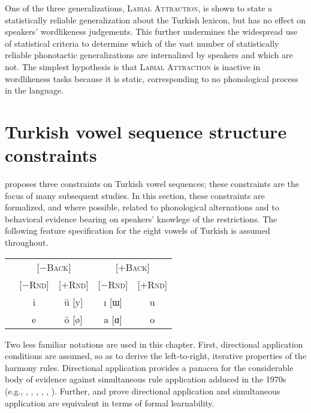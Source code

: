 One of the three generalizations, \textsc{Labial Attraction}, is shown to   state a statistically reliable generalization about the Turkish lexicon, but has no effect on speakers' wordlikeness judgements. This further undermines the widespread use of statistical criteria to determine which of the vast number of statistically reliable phonotactic generalizations are internalized by speakers and which are not. The simplest hypothesis is that \textsc{Labial Attraction} is inactive in wordlikeness tasks because it is static, corresponding to no phonological process in the language.

\section{Turkish vowel sequence structure constraints}

\citet{Lees1966b,Lees1966a} proposes three constraints on Turkish vowel sequences; these constraints are the focus of many subsequent studies. In this section, these constraints are formalized, and where possible, related to phonological alternations and to behavioral evidence bearing on speakers' knowlege of the restrictions. The following feature specification for the eight vowels of Turkish is assumed throughout.

\begin{example}
\begin{tabular}{c c c c c}
                       & \multicolumn{2}{c}{[$-$\textsc{Back}]} & \multicolumn{2}{c}{[$+$\textsc{Back}]} \\
                       & [$-$\textsc{Rnd}] & [$+$\textsc{Rnd}] & [$-$\textsc{Rnd}] & [$+$\textsc{Rnd}] \\ 
\cmidrule{2-5}
 & {i} & {ü} [y] & {ı} [ɯ] & {u} \\
 & {e} & {ö} [ø] & {a} [ɑ] & {o} \\
\end{tabular}
\end{example}

Two less familiar notations are used in this chapter. First, directional application conditions are assumed, so as to derive the left-to-right, iterative properties of the harmony rules. Directional application provides a panacea for the considerable body of evidence against simultaneous rule application adduced in the 1970s (e.g., \citealt[209f.]{Anderson1974}, \citealt{Howard1972}, \citeauthor{Kenstowicz1973} \citeyear[14f.]{Kenstowicz1973}, \citeyear[189f.]{Kenstowicz1977}, \citeyear[318f.]{Kenstowicz1979}, \citealt{Piggott1975}). Further, \citet{Johnson1972} and \citet{Kaplan1994} prove directional application and simultaneous application are equivalent in terms of formal learnability.

